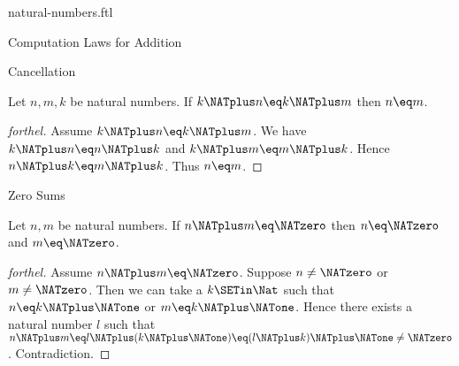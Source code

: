 \documentclass{stex}
\begin{document}
\begin{smodule}{natural-numbers.ftl}
\begin{sfragment}{Computation Laws for Addition}
\begin{sfragment}{Cancellation}
    \begin{corollary}[forthel,id=ARITHMETIC_03_8445946379632640]
      Let $n, m, k$ be natural numbers.
      If $k \NATplus n \eq k \NATplus m$ then $n \eq m$.
    \end{corollary}
    \begin{proof}[forthel]
      Assume $k \NATplus n \eq k \NATplus m$.
      We have $k \NATplus n \eq n \NATplus k$ and $k \NATplus m \eq m \NATplus k$.
      Hence $n \NATplus k \eq m \NATplus k$.
      Thus $n \eq m$.
    \end{proof}
  \end{sfragment}

  \begin{sfragment}{Zero Sums}
    \begin{proposition}[forthel,id=ARITHMETIC_03_3520602170195968]
      Let $n, m$ be natural numbers.
      If $n \NATplus m \eq \NATzero$ then $n \eq \NATzero$ and $m \eq \NATzero$.
    \end{proposition}
    \begin{proof}[forthel]
      Assume $n \NATplus m \eq \NATzero$.
      Suppose $n \neq \NATzero$ or $m \neq \NATzero$.
      Then we can take a $k \SETin \Nat$ such that $n \eq k \NATplus \NATone$ or $m \eq k \NATplus \NATone$.
      Hence there exists a natural number $l$ such that
      $n \NATplus m
        \eq l \NATplus (k \NATplus \NATone)
        \eq (l \NATplus k) \NATplus \NATone
        \neq \NATzero$.
      Contradiction.
    \end{proof}
  \end{sfragment}
\end{sfragment}
\end{smodule}
\end{document}
